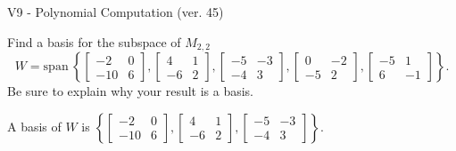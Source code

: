 \begin{exercise}
  \begin{exerciseTitle}V9 - Polynomial Computation (ver. 45)\end{exerciseTitle}
  \begin{exerciseStatement}
    Find a basis for the subspace of \(M_{2,2}\) 
\[W=\mathrm{span}\ \left\{\left[\begin{array}{cc}
-2 & 0 \\
-10 & 6
\end{array}\right] , \left[\begin{array}{cc}
4 & 1 \\
-6 & 2
\end{array}\right] , \left[\begin{array}{cc}
-5 & -3 \\
-4 & 3
\end{array}\right] , \left[\begin{array}{cc}
0 & -2 \\
-5 & 2
\end{array}\right] , \left[\begin{array}{cc}
-5 & 1 \\
6 & -1
\end{array}\right]\right\}.\]
 Be sure to explain why your result is a basis.


  \end{exerciseStatement}
  \begin{exerciseAnswer}
   A basis of \(W\) is  \(\left\{\left[\begin{array}{cc}
-2 & 0 \\
-10 & 6
\end{array}\right] , \left[\begin{array}{cc}
4 & 1 \\
-6 & 2
\end{array}\right] , \left[\begin{array}{cc}
-5 & -3 \\
-4 & 3
\end{array}\right]\right\}\).
  


  \end{exerciseAnswer}
\end{exercise}